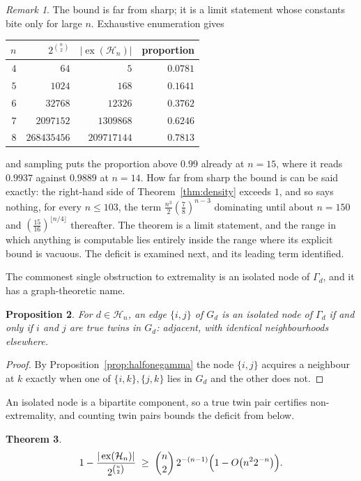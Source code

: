 \documentclass[11pt]{article}
\newtheorem{theorem}{Theorem}[section]
\newtheorem{proposition}[theorem]{Proposition}
\theoremstyle{definition}
\theoremstyle{remark}
\newtheorem{remark}[theorem]{Remark}
\newcommand{\Ha}{\mathcal{H}}
\newcommand{\ex}{\operatorname{ex}}
\begin{document}
\begin{remark}\label{rem:notsharp}
The bound is far from sharp; it is a limit statement whose constants bite only for large
$n$. Exhaustive enumeration gives
\begin{center}
\begin{tabular}{r|r|r|r}
$n$ & $2^{\binom n2}$ & $|\ex(\Ha_n)|$ & proportion\\
\hline
$4$ & $64$ & $5$ & $0.0781$\\
$5$ & $1024$ & $168$ & $0.1641$\\
$6$ & $32768$ & $12326$ & $0.3762$\\
$7$ & $2097152$ & $1309868$ & $0.6246$\\
$8$ & $268435456$ & $209717144$ & $0.7813$
\end{tabular}
\end{center}
and sampling puts the proportion above $0.99$ already at $n=15$, where it reads $0.9937$
against $0.9889$ at $n=14$. How far from sharp the bound is can be said exactly: the
right-hand side of Theorem~\ref{thm:density} exceeds $1$, and so says nothing, for every
$n\leq103$, the term $\tfrac{n^3}2(\tfrac78)^{n-3}$ dominating until about $n=150$ and
$(\tfrac{15}{16})^{\lfloor n/4\rfloor}$ thereafter. The theorem is a limit statement, and
the range in which anything is computable lies entirely inside the range where its explicit
bound is vacuous. The deficit is examined next, and its leading term identified.
\end{remark}

The commonest single obstruction to extremality is an isolated node of $\Gamma_d$, and it
has a graph-theoretic name.

\begin{proposition}\label{prop:twins}
For $d\in\Ha_n$, an edge $\{i,j\}$ of $G_d$ is an isolated node of $\Gamma_d$ if and only
if $i$ and $j$ are \emph{true twins} in $G_d$: adjacent, with identical neighbourhoods
elsewhere.
\end{proposition}

\begin{proof}
By Proposition~\ref{prop:halfonegamma} the node $\{i,j\}$ acquires a neighbour at $k$
exactly when one of $\{i,k\},\{j,k\}$ lies in $G_d$ and the other does not.
\end{proof}

An isolated node is a bipartite component, so a true twin pair certifies non-extremality,
and counting twin pairs bounds the deficit from below.

\begin{theorem}\label{thm:twinbound}
\[
1-\frac{|\ex(\Ha_n)|}{2^{\binom n2}}\;\geq\;
\binom n2\,2^{-(n-1)}\Bigl(1-O\bigl(n^2 2^{-n}\bigr)\Bigr).
\]
\end{theorem}
\end{document}
